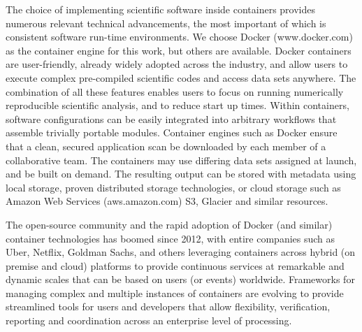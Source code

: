 \documentclass[final]{ametsoc}
\begin{document}
The choice of implementing scientific software inside containers provides numerous relevant technical advancements, the most important of which is consistent software run-time environments. We choose Docker (www.docker.com) as the container engine for this work, but others are available.
Docker containers are user-friendly, already widely adopted across the industry, and allow users to execute complex pre-compiled scientific codes and access data sets anywhere. The combination of all these features enables users to focus on running numerically reproducible scientific analysis, and to reduce start up times. Within containers, software configurations can be easily integrated into arbitrary workflows that assemble trivially portable modules. Container engines such as Docker ensure that a clean, secured application scan be downloaded by each member of a collaborative team. The containers may use differing data sets assigned at launch, and be built on demand. The resulting output can be stored with metadata using local storage, proven distributed storage technologies, or cloud storage such as Amazon Web Services (aws.amazon.com) S3, Glacier and similar resources.   

The open-source community and the rapid adoption of Docker (and similar) container technologies has boomed since 2012, with entire companies such as Uber, Netflix, Goldman Sachs, and others leveraging containers across hybrid (on premise and cloud) platforms to provide continuous services at remarkable and dynamic scales that can be based on users (or events) worldwide.  Frameworks for managing complex and multiple instances of containers are evolving to provide streamlined tools for users and developers that allow flexibility, verification, reporting and coordination across an enterprise level of processing.    
\end{document}
